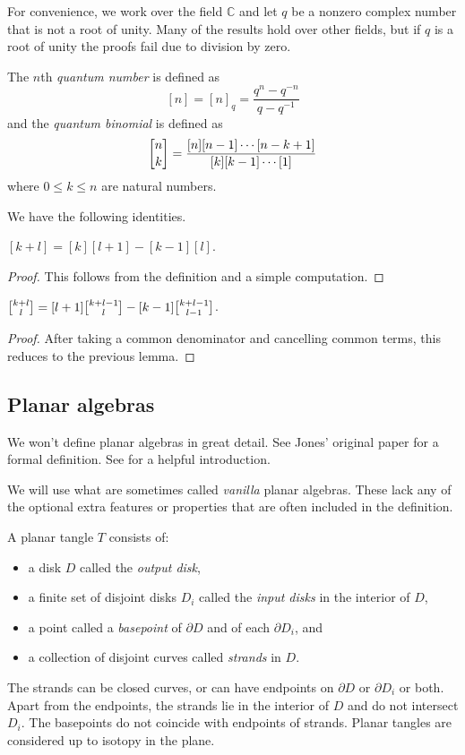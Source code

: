 
For convenience, we work over the field $\mathbb{C}$
and let $q$ be a nonzero complex number that is not a root of unity.
Many of the results hold over other fields,
but if $q$ is a root of unity
the proofs fail due to division by zero.

\begin{defn}
The $n$th {\em quantum number} is defined as 
$$[n] = [n]_q = \frac{q^n-q^{-n}}{q-q^{-1}}$$
and the {\em quantum binomial} is defined as
$$\qbinom{n}{k}=\frac{[n][n-1]\cdots[n-k+1]}{[k][k-1]\cdots[1]}$$
where $0 \le k \le n$ are natural numbers.
\end{defn}

We have the following identities.

\begin{lem}
\label{lem:q}
$[k+l]=[k][l+1] - [k-1][l]$.
\end{lem}

\begin{proof}
This follows from the definition and a simple computation.
\end{proof}

\begin{cor}
\label{cor:q}
$\qbinom{k+l}{l}=[l+1]\qbinom{k+l-1}{l}-[k-1]\qbinom{k+l-1}{l-1}$.
\end{cor}

\begin{proof}
After taking a common denominator and cancelling common terms,
this reduces to the previous lemma.
\end{proof}

\subsection{Planar algebras}

We won't define planar algebras in great detail.
See Jones' original paper \cite{Jones} for a formal definition.
See \cite{D2n} for a helpful introduction.

We will use what are sometimes called {\em vanilla} planar algebras.
These lack any of the optional extra features or properties
that are often included in the definition.

A planar tangle $T$ consists of:
\begin{itemize}
\item a disk $D$ called the {\em output disk},
\item a finite set of disjoint disks $D_i$ called the {\em input disks}
      in the interior of $D$,
\item a point called a {\em basepoint}
      of $\partial D$ and of each $\partial D_i$, and
\item a collection of disjoint curves called {\em strands} in $D$.
\end{itemize}
The strands can be closed curves,
or can have endpoints on $\partial D$
or $\partial D_i$ or both.
Apart from the endpoints,
the strands lie in the interior of $D$
and do not intersect $D_i$.
The basepoints do not coincide with endpoints of strands.
Planar tangles are considered up to isotopy in the plane.


